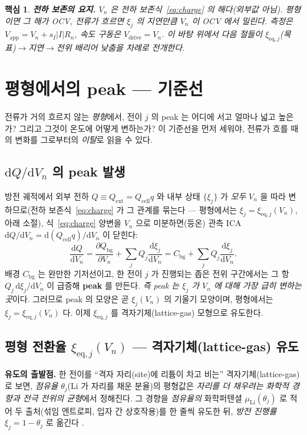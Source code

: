 \documentclass[11pt,a4paper]{article}
\newtheorem*{keybox}{핵심}
\newcommand{\dd}{\mathrm{d}}
\newcommand{\eq}{\mathrm{eq}}
\newcommand{\app}{\mathrm{app}}
\newcommand{\drive}{\mathrm{drive}}
\newcommand{\cell}{\mathrm{cell}}
\newcommand{\bg}{\mathrm{bg}}
\newcommand{\ext}{\mathrm{ext}}
\begin{document}
\begin{keybox}
\textbf{전하 보존의 요지.} $V_n$ 은 전하 보존식~\eqref{eq:charge} 의 해다(외부값 아님). 평형이면 그 해가 OCV,
전류가 흐르면 $\xi_j$ 의 지연만큼 $V_n$ 이 OCV 에서 밀린다. 측정은 $V_\app=V_n+s_I|I|R_n$, 속도 구동은
$V_\drive=V_n$. 이 바탕 위에서 다음 절들이 $\xi_{\eq,j}$(목표)$\to$지연$\to$전위 배리어 낮춤을 차례로 전개한다.
\end{keybox}

\section{평형에서의 peak — 기준선}\label{sec:eqpeak}
전류가 거의 흐르지 않는 \emph{평형}에서, 전이 $j$ 의 peak 는 어디에 서고 얼마나 넓고 높은가? 그리고
그것이 온도에 어떻게 변하는가? 이 기준선을 먼저 세워야, 전류가 흐를 때의 변화를 그로부터의 \emph{이탈}로 읽을
수 있다.

\subsection{$\dd Q/\dd V_n$ 의 peak 발생}
방전 궤적에서 외부 전하 $Q\equiv Q_\ext=Q_\cell q$ 와 내부 상태 $\{\xi_j\}$ 가 \emph{모두} $V_n$ 을 따라 변하므로(전하
보존식~\eqref{eq:charge} 가 그 관계를 묶는다 — 평형에서는 $\xi_j=\xi_{\eq,j}(V_n)$, 아래 소절), 식~\eqref{eq:charge}
양변을 $V_n$ 으로 미분하면(등온) 관측 ICA $\dd Q/\dd V_n=\dd(Q_\cell q)/\dd V_n$ 이 닫힌다:
\begin{equation}
\frac{\dd Q}{\dd V_n}=\frac{\partial Q_\bg}{\partial V_n}+\sum_j Q_j\frac{\dd\xi_j}{\dd V_n}
=C_\bg+\sum_j Q_j\frac{\dd\xi_j}{\dd V_n}.
\label{eq:dQdV}
\end{equation}
배경 $C_\bg$ 는 완만한 기저선이고, 한 전이 $j$ 가 진행되는 좁은 전위 구간에서는 그 항 $Q_j\,\dd\xi_j/\dd V_n$ 이
급증해 \textbf{peak} 를 만든다. \emph{즉 peak 는 $\xi_j$ 가 $V_n$ 에 대해 가장 급히 변하는 곳}이다. 그러므로
peak 의 모양은 곧 $\xi_j(V_n)$ 의 기울기 모양이며, 평형에서는 $\xi_j=\xi_{\eq,j}(V_n)$ 다. 이제 $\xi_{\eq,j}$ 를
격자기체(lattice-gas) 모형으로 유도한다.

\subsection{평형 전환율 $\xi_{\eq,j}(V_n)$ — 격자기체(lattice-gas) 유도}
\textbf{유도의 출발점.} 한 전이를 ``격자 자리(site)에 리튬이 차고 비는'' 격자기체(lattice-gas)로 보면, \emph{점유율}
$\theta_j$(Li 가 자리를 채운 분율)의 평형값은 \emph{자리를 더 채우려는 화학적 경향과 전극 전위의 균형}에서 정해진다.
그 경향을 \emph{점유율의} 화학퍼텐셜 $\mu_\mathrm{Li}(\theta_j)$ 로 적어 두 출처(섞임 엔트로피, 입자 간 상호작용)를 한
줄씩 유도한 뒤, \emph{방전 진행률} $\xi_j=1-\theta_j$ 로 옮긴다 \cite{mckinnon1983,bazant2013}.
\end{document}
